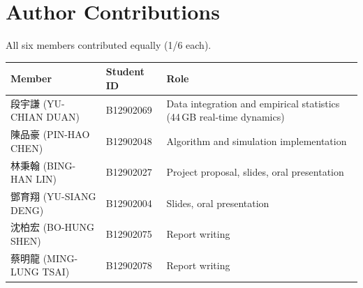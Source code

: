 \documentclass[11pt,a4paper]{article}
\begin{document}
\section*{Author Contributions}
All six members contributed equally (1/6 each).
\begin{table}[h]\centering\small
\begin{tabular}{>{\raggedright\arraybackslash}p{4.6cm}l>{\raggedright\arraybackslash}p{7.6cm}}
\toprule
Member & Student ID & Role \\
\midrule
段宇謙 (YU-CHIAN DUAN) & B12902069 & Data integration and empirical statistics (44\,GB real-time dynamics) \\
陳品豪 (PIN-HAO CHEN) & B12902048 & Algorithm and simulation implementation \\
林秉翰 (BING-HAN LIN) & B12902027 & Project proposal, slides, oral presentation \\
鄧育翔 (YU-SIANG DENG) & B12902004 & Slides, oral presentation \\
沈柏宏 (BO-HUNG SHEN) & B12902075 & Report writing \\
蔡明龍 (MING-LUNG TSAI) & B12902078 & Report writing \\
\bottomrule
\end{tabular}
\end{table}

{\small

}
\end{document}
